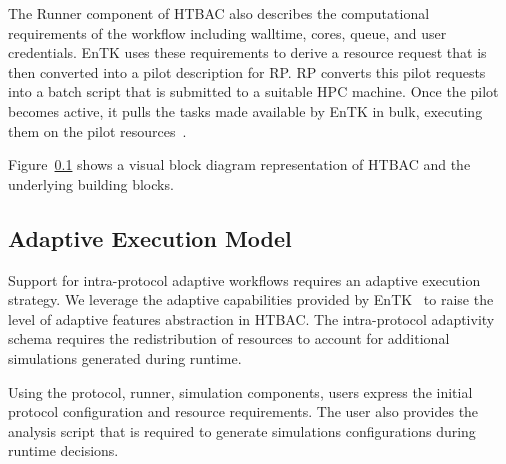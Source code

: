 The Runner component of HTBAC also describes the computational requirements
of the workflow including walltime, cores, queue, and user credentials. EnTK
uses these requirements to derive a resource request that is then converted
into a pilot description for RP. RP converts this pilot requests into a batch
script that is submitted to a suitable HPC machine. Once the pilot becomes
active, it pulls the tasks made available by EnTK in bulk, executing them on
the pilot resources~\cite{merzky2015radical}.

Figure~\ref{} shows a visual block diagram representation  of HTBAC and the underlying building
blocks.

\subsection{Adaptive Execution Model}

Support for intra-protocol adaptive workflows requires an adaptive execution 
strategy. We leverage the adaptive capabilities provided by 
EnTK~\cite{adaptivebiomolecular} to raise the level of adaptive features 
abstraction in HTBAC. The intra-protocol adaptivity schema requires the 
redistribution of resources to account for additional simulations generated 
during runtime. 


Using the protocol, runner, simulation components, users express the initial 
protocol configuration and resource requirements. The user also provides the 
analysis script that is required to generate simulations configurations during 
runtime decisions. 


